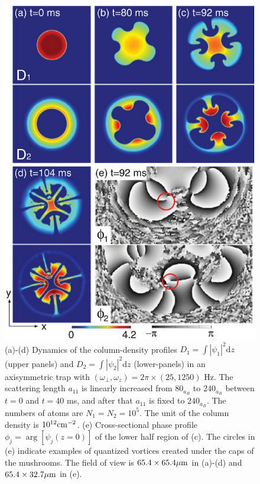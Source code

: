 \documentclass[12pt,a4paper]{report}
\newcommand{\diff}{\mathrm{d}}				            %
\begin{document}
\begin{figure}[htbp]
\begin{center}
\includegraphics[scale=0.5,keepaspectratio]{5-1.eps}
\caption{(a)-(d) Dynamics of the column-density
profiles $D_1 = \int |\psi_1|^2 \diff z$(upper panels) and
$D_2 = \int |\psi_2|^2 \diff z$ (lower-panels) in an axisymmetric trap with
$( \omega_\perp , \omega_z ) = 2 \pi \times (25, 1250)$ Hz.
The scattering length $a_{11}$ is linearly increased from $80_{a_B}$ to $240_{a_B}$
between $t=0$ and $t=40$ ms, and after that $a_{11}$ is fixed to $240_{a_B}$.
The numbers of atoms are $N_1 = N_2 = 10^5$. The unit of the column density
is $10^{12} {\rm cm}^{-2}$. (e) Cross-sectional phase profile $\phi_j = \arg [\psi_j(z=0)]$
of the lower half region of (c). The circles in (e) indicate examples
of quantized vortices created under the caps of the mushrooms. The
field of view is $65.4 \times 65.4 {\rm \mu m}$ in (a)-(d) and $65.4 \times 32.7 {\rm \mu m}$ in (e).}
\label{FIG:5-1}
\end{center}
\end{figure}
\end{document}
